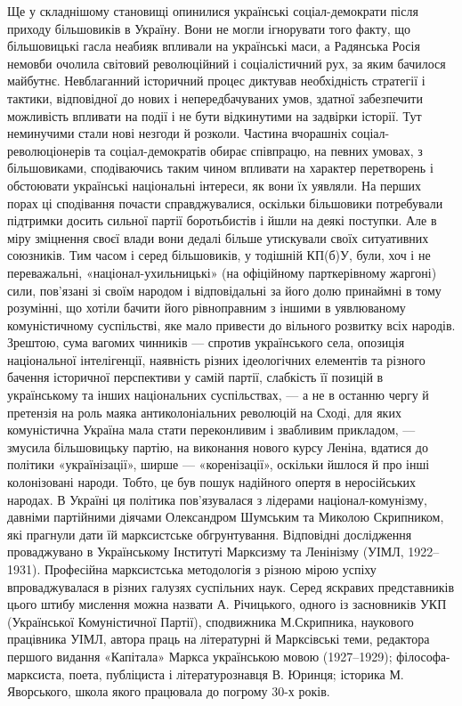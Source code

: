 Ще у складнішому становищі опинилися українські соціал-демократи 
після приходу більшовиків в Україну. Вони не могли ігнорувати того 
факту, що більшовицькі гасла неабияк впливали на українські маси, а 
Радянська Росія немовби очолила світовий революційний і 
соціалістичний рух, за яким бачилося майбутнє. Невблаганний 
історичний процес диктував необхідність стратегії і тактики, 
відповідної до нових і непередбачуваних умов, здатної забезпечити 
можливість впливати на події і не бути відкинутими на задвірки 
історії. Тут неминучими стали нові незгоди й розколи. Частина 
вчорашніх соціал-революціонерів та соціал-демократів обирає 
співпрацю, на певних умовах, з більшовиками, сподіваючись таким чином 
впливати на характер перетворень і обстоювати українські національні 
інтереси, як вони їх уявляли. На перших порах ці сподівання почасти 
справджувалися, оскільки більшовики потребували підтримки досить 
сильної партії боротьбистів і йшли на деякі поступки. Але в міру 
зміцнення своєї влади вони дедалі більше утискували своїх 
ситуативних союзників. Тим часом і серед більшовиків, у тодішній 
КП(б)У, були, хоч і не переважальні, «націонал-ухильницькі» (на 
офіційному парткерівному жаргоні) сили, пов'язані зі своїм народом і 
відповідальні за його долю принаймні в тому розумінні, що хотіли 
бачити його рівноправним з іншими в уявлюваному комуністичному 
суспільстві, яке мало привести до вільного розвитку всіх народів. 
Зрештою, сума вагомих чинників — спротив українського села, опозиція 
національної інтелігенції, наявність різних ідеологічних елементів 
та різного бачення історичної перспективи у самій партії, слабкість 
її позицій в українському та інших національних суспільствах, — а не в 
останню чергу й претензія на роль маяка антиколоніальних революцій на 
Сході, для яких комуністична Україна мала стати переконливим і 
звабливим прикладом, — змусила більшовицьку партію, на виконання 
нового курсу Леніна, вдатися до політики «українізації», ширше —
«коренізації», оскільки йшлося й про інші колонізовані народи. Тобто, 
це був пошук надійного опертя в неросійських народах. В Україні ця 
політика пов'язувалася з лідерами націонал-комунізму, давніми 
партійними діячами Олександром Шумським та Миколою Скрипником, які 
прагнули дати їй марксистське обгрунтування. Відповідні дослідження 
проваджувано в Українському Інституті Марксизму та Ленінізму (УІМЛ, 
1922--1931). Професійна марксистська методологія з різною мірою успіху 
впроваджувалася в різних галузях суспільних наук. Серед яскравих 
представників цього штибу мислення можна назвати А. Річицького, 
одного із засновників УКП (Української Комуністичної Партії), 
сподвижника М.Скрипника, наукового працівника УІМЛ, автора праць на 
літературні й Марксівські теми, редактора першого видання «Капітала» 
Маркса українською мовою (1927--1929); філософа-марксиста, поета, 
публіциста і літературознавця В. Юринця; історика М. Яворського, школа 
якого працювала до погрому 30-х років. 


